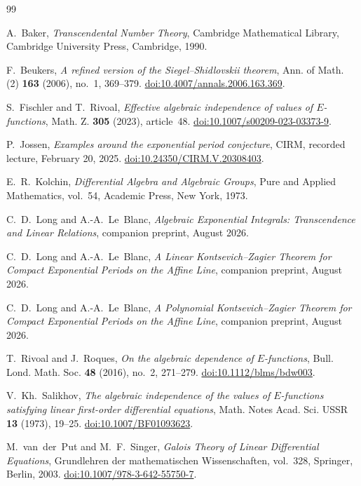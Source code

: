 \documentclass[11pt]{article}
\numberwithin{equation}{section}
\theoremstyle{definition}
\theoremstyle{remark}
\begin{document}
\small
\begin{thebibliography}{99}

A.~Baker,
\emph{Transcendental Number Theory},
Cambridge Mathematical Library,
Cambridge University Press, Cambridge, 1990.

F.~Beukers,
\emph{A refined version of the Siegel--Shidlovskii theorem},
Ann. of Math. (2) \textbf{163} (2006), no.~1, 369--379.
\href{https://doi.org/10.4007/annals.2006.163.369}{doi:10.4007/annals.2006.163.369}.

S.~Fischler and T.~Rivoal,
\emph{Effective algebraic independence of values of $E$-functions},
Math. Z. \textbf{305} (2023), article~48.
\href{https://doi.org/10.1007/s00209-023-03373-9}{doi:10.1007/s00209-023-03373-9}.

P.~Jossen,
\emph{Examples around the exponential period conjecture},
CIRM, recorded lecture, February 20, 2025.
\href{https://doi.org/10.24350/CIRM.V.20308403}{doi:10.24350/CIRM.V.20308403}.

E.~R.~Kolchin,
\emph{Differential Algebra and Algebraic Groups},
Pure and Applied Mathematics, vol.~54,
Academic Press, New York, 1973.

C.~D.~Long and A.-A.~Le~Blanc,
\emph{Algebraic Exponential Integrals: Transcendence and Linear Relations},
companion preprint, August 2026.

C.~D.~Long and A.-A.~Le~Blanc,
\emph{A Linear Kontsevich--Zagier Theorem for Compact Exponential Periods on
the Affine Line},
companion preprint, August 2026.

C.~D.~Long and A.-A.~Le~Blanc,
\emph{A Polynomial Kontsevich--Zagier Theorem for Compact Exponential Periods
on the Affine Line},
companion preprint, August 2026.

T.~Rivoal and J.~Roques,
\emph{On the algebraic dependence of $E$-functions},
Bull. Lond. Math. Soc. \textbf{48} (2016), no.~2, 271--279.
\href{https://doi.org/10.1112/blms/bdw003}{doi:10.1112/blms/bdw003}.

V.~Kh.~Salikhov,
\emph{The algebraic independence of the values of $E$-functions satisfying
linear first-order differential equations},
Math. Notes Acad. Sci. USSR \textbf{13} (1973), 19--25.
\href{https://doi.org/10.1007/BF01093623}{doi:10.1007/BF01093623}.

M.~van~der~Put and M.~F.~Singer,
\emph{Galois Theory of Linear Differential Equations},
Grundlehren der mathematischen Wissenschaften, vol.~328,
Springer, Berlin, 2003.
\href{https://doi.org/10.1007/978-3-642-55750-7}{doi:10.1007/978-3-642-55750-7}.

\end{thebibliography}
\end{document}
